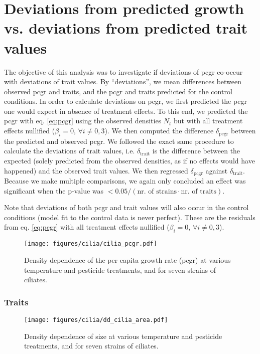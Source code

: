 \section{Deviations from predicted growth vs. deviations from predicted trait values}

The objective of this analysis was to investigate if deviations of pcgr co-occur with deviations of trait values. By ``deviations'', we mean differences between observed pcgr and traits, and the pcgr and traits predicted for the control conditions. In order to calculate deviations on pcgr, we first predicted the pcgr one would expect in absence of treatment effects. To this end, we predicted the pcgr with eq. \ref{eq:pcgr} using the observed densities $N_t$ but with all treatment effects nullified ($\beta_i=0$, $\forall i \neq 0, 3$). We then computed the difference $\delta_\textrm{pcgr}$ between the predicted and observed pcgr. We followed the exact same procedure to calculate the deviations of trait values, i.e. $\delta_\textrm{trait}$ is the difference between the expected (solely predicted from the observed densities, as if no effects would have happened) and the observed trait values. We then regressed $\delta_\textrm{pcgr}$ against $\delta_\textrm{trait}$. Because we make multiple comparisons, we again only concluded an effect was significant when the p-value was $<0.05/(\textrm{nr. of strains}\cdot \textrm{nr. of traits})$. 

Note that deviations of both pcgr and trait values will also occur in the control conditions (model fit to the control data is never perfect). These are the residuals from eq. \ref{eq:pcgr} with all treatment effects nullified ($\beta_i=0$, $\forall i \neq 0, 3$). 

\begin{figure}[hbt!]
    \centering
    \texttt{[image: figures/cilia/cilia\_pcgr.pdf]}
    \caption{Density dependence of the per capita growth rate (pcgr) at various temperature and pesticide treatments, and for seven strains of ciliates.}
    \label{fig:dd_cilia}
\end{figure}

\clearpage

\subsubsection{Traits}

\begin{figure}[hbt!]
    \centering
    \texttt{[image: figures/cilia/dd\_cilia\_area.pdf]}
    \caption{Density dependence of size at various temperature and pesticide treatments, and for seven strains of ciliates.}
    \label{fig:dd_cilia_area}
\end{figure}

